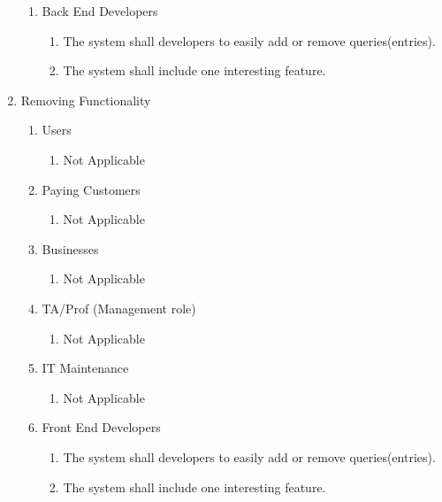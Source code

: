 \documentclass[titlepage]{article}
\begin{document}
\begin{enumerate}[\textbf{{BE}1.}]
\begin{enumerate}[\textbf{{VP4}.1}]
				\item Back End Developers
				\begin{enumerate}
					\item The system shall developers to easily add or remove queries(entries).
					\item The system shall include one interesting feature.
				\end{enumerate}
			\end{enumerate}
			
			\item Removing Functionality
			\begin{enumerate}[\textbf{{VP5}.1}]
				
				\item Users
				\begin{enumerate}
					\item Not Applicable
				\end{enumerate}
				
				\item Paying Customers
				\begin{enumerate}
					\item Not Applicable
				\end{enumerate}
				
				\item Businesses
				\begin{enumerate}
					\item Not Applicable
				\end{enumerate}
				
				\item TA/Prof (Management role)
				\begin{enumerate}
					\item Not Applicable
				\end{enumerate}
				
				\item IT Maintenance
				\begin{enumerate}
					\item Not Applicable
				\end{enumerate}
				
				\item Front End Developers
				\begin{enumerate}
					\item The system shall developers to easily add or remove queries(entries).
					\item The system shall include one interesting feature.
				\end{enumerate}
				

\end{enumerate}
\end{enumerate}
\end{document}
